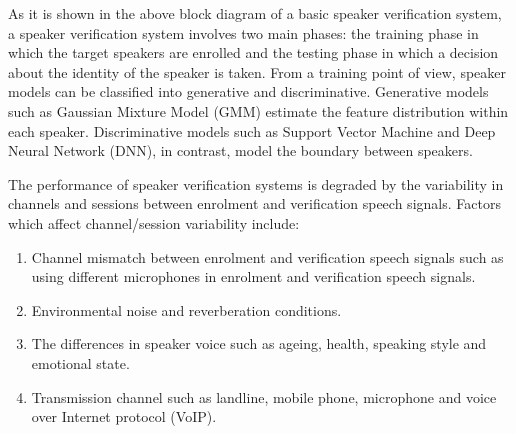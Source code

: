 \documentclass[letterpaper,10pt,english]{jupyterBook}
\begin{document}
\sphinxAtStartPar
As it is shown in the above block diagram of a basic speaker
verification system, a speaker verification system involves two main
phases: the training phase in which the target speakers are enrolled and
the testing phase in which a decision about the identity of the speaker
is taken. From a training point of view, speaker models can be
classified into generative and discriminative. Generative models such as
Gaussian Mixture Model (GMM) estimate the feature distribution within
each speaker. Discriminative models such as Support Vector Machine and
Deep Neural Network (DNN), in contrast, model the boundary between
speakers.

\sphinxAtStartPar
The performance of speaker verification systems is degraded by the
variability in channels and sessions between enrolment and verification
speech signals. Factors which affect channel/session variability
include:
\begin{enumerate}
%
\item {} 
\sphinxAtStartPar
Channel mismatch between enrolment and verification speech signals
such as using different microphones in enrolment and verification
speech signals.

\item {} 
\sphinxAtStartPar
Environmental noise and reverberation conditions.

\item {} 
\sphinxAtStartPar
The differences in speaker voice such as ageing, health, speaking
style and emotional state.

\item {} 
\sphinxAtStartPar
Transmission channel such as landline, mobile phone, microphone and
voice over Internet protocol (VoIP).

\end{enumerate}
\end{document}
